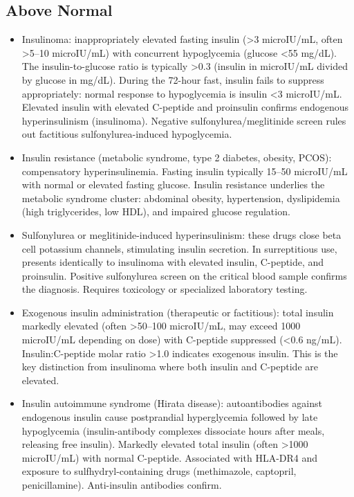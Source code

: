 \subsection*{Above Normal}
\begin{itemize}
  \item Insulinoma: inappropriately elevated fasting insulin (>3 microIU/mL, often >5--10 microIU/mL) with concurrent hypoglycemia (glucose <55 mg/dL). The insulin-to-glucose ratio is typically >0.3 (insulin in microIU/mL divided by glucose in mg/dL). During the 72-hour fast, insulin fails to suppress appropriately: normal response to hypoglycemia is insulin <3 microIU/mL. Elevated insulin with elevated C-peptide and proinsulin confirms endogenous hyperinsulinism (insulinoma). Negative sulfonylurea/meglitinide screen rules out factitious sulfonylurea-induced hypoglycemia.
  \item Insulin resistance (metabolic syndrome, type 2 diabetes, obesity, PCOS): compensatory hyperinsulinemia. Fasting insulin typically 15--50 microIU/mL with normal or elevated fasting glucose. Insulin resistance underlies the metabolic syndrome cluster: abdominal obesity, hypertension, dyslipidemia (high triglycerides, low HDL), and impaired glucose regulation.
  \item Sulfonylurea or meglitinide-induced hyperinsulinism: these drugs close beta cell potassium channels, stimulating insulin secretion. In surreptitious use, presents identically to insulinoma with elevated insulin, C-peptide, and proinsulin. Positive sulfonylurea screen on the critical blood sample confirms the diagnosis. Requires toxicology or specialized laboratory testing.
  \item Exogenous insulin administration (therapeutic or factitious): total insulin markedly elevated (often >50--100 microIU/mL, may exceed 1000 microIU/mL depending on dose) with C-peptide suppressed (<0.6 ng/mL). Insulin:C-peptide molar ratio >1.0 indicates exogenous insulin. This is the key distinction from insulinoma where both insulin and C-peptide are elevated.
  \item Insulin autoimmune syndrome (Hirata disease): autoantibodies against endogenous insulin cause postprandial hyperglycemia followed by late hypoglycemia (insulin-antibody complexes dissociate hours after meals, releasing free insulin). Markedly elevated total insulin (often >1000 microIU/mL) with normal C-peptide. Associated with HLA-DR4 and exposure to sulfhydryl-containing drugs (methimazole, captopril, penicillamine). Anti-insulin antibodies confirm.

\end{itemize}
